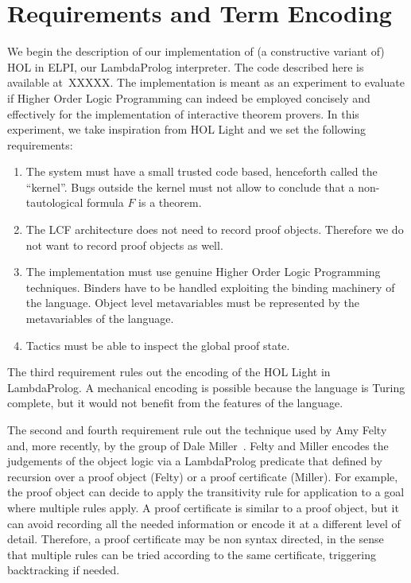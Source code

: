 \documentclass[preprint]{sigplanconf}
\begin{document}
\section{Requirements and Term Encoding}
We begin the description of our implementation of (a constructive variant of)
HOL in ELPI, our LambdaProlog interpreter. The code described here is available at~XXXXX. The implementation is meant as an experiment to evaluate if Higher Order Logic Programming can indeed be employed concisely and effectively for the implementation of interactive theorem provers. In this experiment, we take inspiration from HOL Light and we set the following requirements:
\begin{enumerate}
\item The system must have a small trusted code based, henceforth called the ``kernel''. Bugs outside the kernel must not allow to conclude that a non-tautological formula $F$ is a theorem.
\item The LCF architecture does not need to record proof objects. Therefore we do not want to record proof objects as well.
\item The implementation must use genuine Higher Order Logic Programming techniques. Binders have to be handled exploiting the binding machinery of the language. Object level metavariables must be represented by the metavariables of the language.
\item Tactics must be able to inspect the global proof state.
\end{enumerate}

The third requirement rules out the encoding of the HOL Light in LambdaProlog. A mechanical encoding is possible because the language is Turing complete, but it would not benefit from the features of the language.

The second and fourth requirement rule out the technique used by Amy Felty and, more recently, by the group of Dale Miller~\cite{miller3}. Felty and Miller encodes the judgements of the object logic via a LambdaProlog predicate that defined by recursion over a proof object (Felty) or a proof certificate (Miller).
For example, the proof object can decide to apply the transitivity rule for application to a goal where multiple rules apply. A proof certificate is similar to a proof object, but it can avoid recording all the needed information or encode it at a different level of detail. Therefore, a proof certificate may be non syntax directed, in the sense that multiple rules can be tried according to the same certificate, triggering backtracking if needed.
\end{document}
